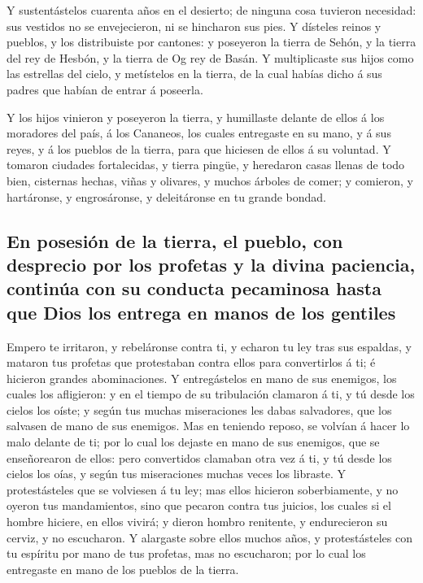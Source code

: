  Y sustentástelos cuarenta años en el desierto; de
ninguna cosa tuvieron necesidad: sus vestidos no se envejecieron, ni se
hincharon sus pies.  Y dísteles reinos y pueblos, y los
distribuiste por cantones: y poseyeron la tierra de Sehón, y la tierra
del rey de Hesbón, y la tierra de Og rey de Basán.  Y
multiplicaste sus hijos como las estrellas del cielo, y metístelos en la
tierra, de la cual habías dicho á sus padres que habían de entrar á
poseerla.

 Y los hijos vinieron y poseyeron la tierra, y humillaste
delante de ellos á los moradores del país, á los Cananeos, los cuales
entregaste en su mano, y á sus reyes, y á los pueblos de la tierra, para
que hiciesen de ellos á su voluntad.  Y tomaron ciudades
fortalecidas, y tierra pingüe, y heredaron casas llenas de todo bien,
cisternas hechas, viñas y olivares, y muchos árboles de comer; y
comieron, y hartáronse, y engrosáronse, y deleitáronse en tu grande
bondad.

\hypertarget{en-posesiuxf3n-de-la-tierra-el-pueblo-con-desprecio-por-los-profetas-y-la-divina-paciencia-continuxfaa-con-su-conducta-pecaminosa-hasta-que-dios-los-entrega-en-manos-de-los-gentiles}{%
\subsection{En posesión de la tierra, el pueblo, con desprecio por los
profetas y la divina paciencia, continúa con su conducta pecaminosa
hasta que Dios los entrega en manos de los
gentiles}\label{en-posesiuxf3n-de-la-tierra-el-pueblo-con-desprecio-por-los-profetas-y-la-divina-paciencia-continuxfaa-con-su-conducta-pecaminosa-hasta-que-dios-los-entrega-en-manos-de-los-gentiles}}

 Empero te irritaron, y rebeláronse contra ti, y echaron
tu ley tras sus espaldas, y mataron tus profetas que protestaban contra
ellos para convertirlos á ti; é hicieron grandes abominaciones.
 Y entregástelos en mano de sus enemigos, los cuales los
afligieron: y en el tiempo de su tribulación clamaron á ti, y tú desde
los cielos los oíste; y según tus muchas miseraciones les dabas
salvadores, que los salvasen de mano de sus enemigos. 
Mas en teniendo reposo, se volvían á hacer lo malo delante de ti; por lo
cual los dejaste en mano de sus enemigos, que se enseñorearon de ellos:
pero convertidos clamaban otra vez á ti, y tú desde los cielos los oías,
y según tus miseraciones muchas veces los libraste.  Y
protestásteles que se volviesen á tu ley; mas ellos hicieron
soberbiamente, y no oyeron tus mandamientos, sino que pecaron contra tus
juicios, los cuales si el hombre hiciere, en ellos vivirá; y dieron
hombro renitente, y endurecieron su cerviz, y no escucharon.
 Y alargaste sobre ellos muchos años, y protestásteles
con tu espíritu por mano de tus profetas, mas no escucharon; por lo cual
los entregaste en mano de los pueblos de la tierra.

